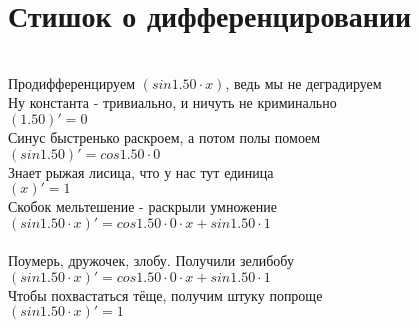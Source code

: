\documentclass[a4paper,12pt]{article}
\begin{document}
\section*{Стишок о дифференцировании}\\
Продифференцируем $( sin 1.50  \cdot x)$, ведь мы не деградируем\\
Ну константа - тривиально, и ничуть не криминально\\
\begin{math}
	(1.50)' = 0
\end{math}\\
Синус быстренько раскроем, а потом полы помоем\\
\begin{math}
	( sin 1.50 )' =  cos 1.50  \cdot 0
\end{math}\\
Знает рыжая лисица, что у нас тут единица\\
\begin{math}
	(x)' = 1
\end{math}\\
Скобок мельтешение - раскрыли умножение\\
\begin{math}
	( sin 1.50  \cdot x)' =  cos 1.50  \cdot 0 \cdot x +  sin 1.50  \cdot 1
\end{math}\\
\\Поумерь, дружочек, злобу. Получили зелибобу\\ $( sin 1.50  \cdot x)' =  cos 1.50  \cdot 0 \cdot x +  sin 1.50  \cdot 1$\\
Чтобы похвастаться тёще, получим штуку попроще\\
$( sin 1.50  \cdot x)' = 1$\\
\end{document}
